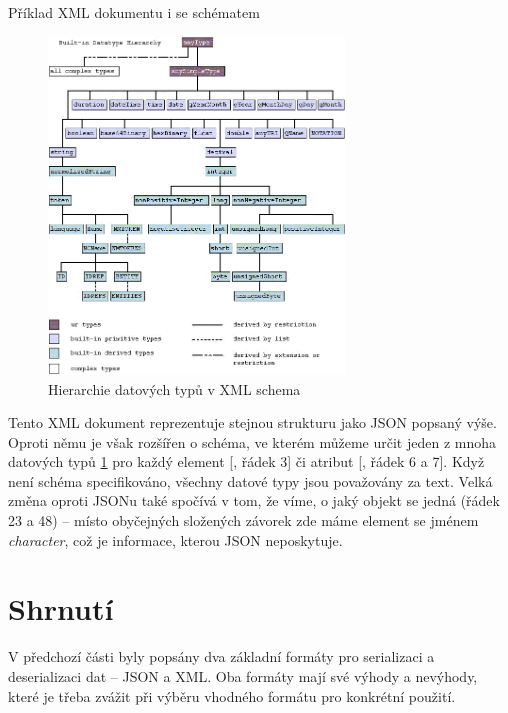 \begin{listing}[ht!]
    \inputminted{xml}{resources/code/standards/player.xml}
    \caption{Příklad XML dokumentu i se schématem}
    \label{code:xml_player}
\end{listing}

\begin{figure}[ht!]
    \centering
    \includegraphics[width=0.7\textwidth]{figures/type-hierarchy.png}
    \caption{Hierarchie datových typů v XML schema \cite[]{w3XMLSchemaBuiltIn}}
    \label{fig:xml_datatypes}
\end{figure}


Tento XML dokument  reprezentuje stejnou strukturu jako JSON popsaný výše. Oproti němu je však rozšířen o schéma, ve kterém můžeme určit jeden z mnoha datových typů \ref{fig:xml_datatypes} pro každý element [, řádek 3] či atribut [, řádek 6 a 7]. Když není schéma specifikováno, všechny datové typy jsou považovány za text. Velká změna oproti JSONu také spočívá v tom, že víme, o jaký objekt se jedná (řádek 23 a 48) -- místo obyčejných složených závorek zde máme element se jménem \textit{character}, což je informace, kterou JSON neposkytuje.


\section{Shrnutí}
V předchozí části byly popsány dva základní formáty pro serializaci a deserializaci dat -- JSON a XML. Oba formáty mají své výhody a nevýhody, které je třeba zvážit při výběru vhodného formátu pro konkrétní použití.

